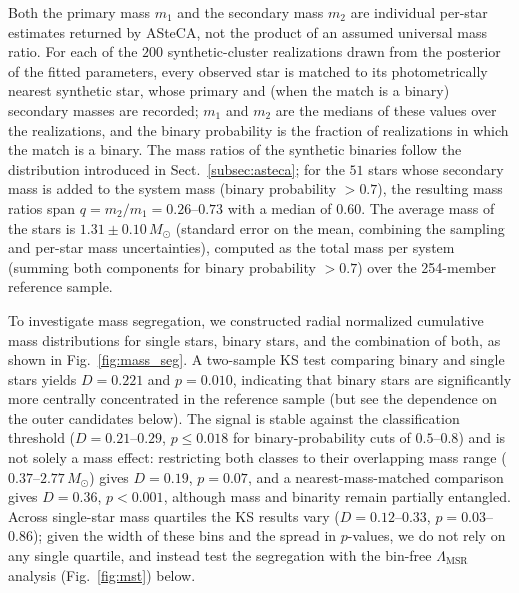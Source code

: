 \documentclass{aa}
\begin{document}
Both the primary mass $m_1$ and the secondary mass $m_2$ are individual per-star estimates returned by ASteCA, not the product of an assumed universal mass ratio. For each of the $200$ synthetic-cluster realizations drawn from the posterior of the fitted parameters, every observed star is matched to its photometrically nearest synthetic star, whose primary and (when the match is a binary) secondary masses are recorded; $m_1$ and $m_2$ are the medians of these values over the realizations, and the binary probability is the fraction of realizations in which the match is a binary. The mass ratios of the synthetic binaries follow the \citet{2013ARA&A..51..269D} distribution introduced in Sect.~\ref{subsec:asteca}; for the $51$ stars whose secondary mass is added to the system mass (binary probability $>0.7$), the resulting mass ratios span $q=m_2/m_1=0.26$--$0.73$ with a median of $0.60$. The average mass of the stars is $1.31 \pm 0.10\,M_\odot$ (standard error on the mean, combining the sampling and per-star mass uncertainties), computed as the total mass per system (summing both components for binary probability $>0.7$) over the 254-member reference sample.

To investigate mass segregation, we constructed radial normalized cumulative mass distributions for single stars, binary stars, and the combination of both, as shown in Fig.~\ref{fig:mass_seg}. A two-sample KS test comparing binary and single stars yields $D=0.221$ and $p=0.010$, indicating that binary stars are significantly more centrally concentrated in the reference sample (but see the dependence on the outer candidates below). The signal is stable against the classification threshold ($D=0.21$--$0.29$, $p\leq0.018$ for binary-probability cuts of $0.5$--$0.8$) and is not solely a mass effect: restricting both classes to their overlapping mass range ($0.37$--$2.77\,M_\odot$) gives $D=0.19$, $p=0.07$, and a nearest-mass-matched comparison gives $D=0.36$, $p<0.001$, although mass and binarity remain partially entangled. Across single-star mass quartiles the KS results vary ($D=0.12$--$0.33$, $p=0.03$--$0.86$); given the width of these bins and the spread in $p$-values, we do not rely on any single quartile, and instead test the segregation with the bin-free $\Lambda_{\mathrm{MSR}}$ analysis (Fig.~\ref{fig:mst}) below.
\end{document}
